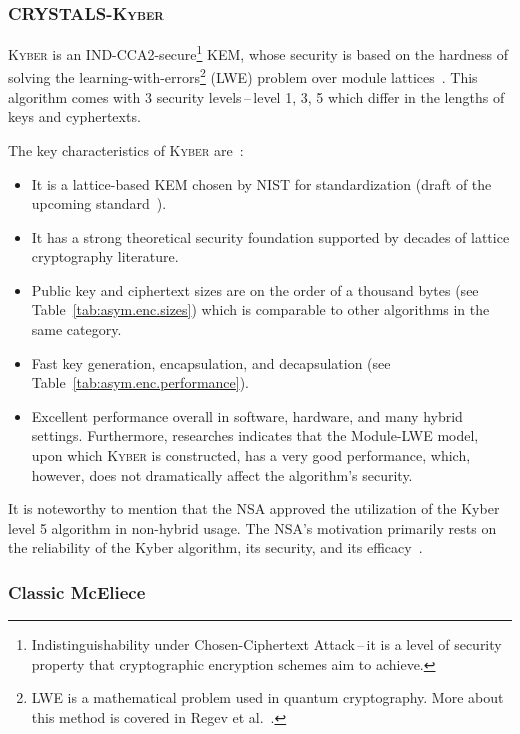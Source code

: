 \subsubsection{\textsc{CRYSTALS-Kyber}}

\textsc{Kyber} is an IND-CCA2-secure\footnote{Indistinguishability under Chosen-Ciphertext Attack\,--\,it is a level of security property that cryptographic encryption schemes aim to achieve.} KEM, whose security is based on the hardness of solving the learning-with-errors\footnote{LWE is a mathematical problem used in quantum cryptography. More about this method is covered in Regev et al.~\cite{lwe.article}.} (LWE) problem over module lattices~\cite{kem.kyber}. This algorithm comes with 3 security levels\,--\,level 1, 3, 5 which differ in the lengths of keys and cyphertexts.

\noindent The key characteristics of \textsc{Kyber} are~\cite{NIST.round3.report}:

\begin{itemize}
    \item It is a lattice-based KEM chosen by NIST for standardization (draft of the upcoming standard~\cite{kem.man.kyber}).
    \item It has a strong theoretical security foundation supported by decades of lattice cryptography literature.
    \item Public key and ciphertext sizes are on the order of a thousand bytes (see Table~\ref{tab:asym.enc.sizes}) which is comparable to other algorithms in the same category.
    \item Fast key generation, encapsulation, and decapsulation (see Table~\ref{tab:asym.enc.performance}). 
    \item Excellent performance overall in software, hardware, and many hybrid settings. Furthermore, researches indicates that the Module-LWE model, upon which \textsc{Kyber} is constructed, has a very good performance, which, however, does not dramatically affect the algorithm's security.
\end{itemize}

It is noteworthy to mention that the NSA approved the utilization of the Kyber level 5 algorithm in non-hybrid usage. The NSA's motivation primarily rests on the reliability of the Kyber algorithm, its security, and its efficacy~\cite{NUKIB.min.attachment}.

\subsubsection{Classic McEliece}

